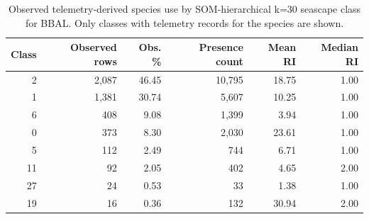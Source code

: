 \begin{table}[htbp]
\centering
\scriptsize
\caption{Observed telemetry-derived species use by SOM-hierarchical k=30 seascape class for BBAL. Only classes with telemetry records for the species are shown.}
\label{tab:appendix-observed-seascape-use-bbal}
\begin{tabular}{rrrrrr}
\hline
Class & Observed rows & Obs. \% & Presence count & Mean RI & Median RI \\
\hline
2 & 2,087 & 46.45 & 10,795 & 18.75 & 1.00 \\
1 & 1,381 & 30.74 & 5,607 & 10.25 & 1.00 \\
6 & 408 & 9.08 & 1,399 & 3.94 & 1.00 \\
0 & 373 & 8.30 & 2,030 & 23.61 & 1.00 \\
5 & 112 & 2.49 & 744 & 6.71 & 1.00 \\
11 & 92 & 2.05 & 402 & 4.65 & 2.00 \\
27 & 24 & 0.53 & 33 & 1.38 & 1.00 \\
19 & 16 & 0.36 & 132 & 30.94 & 2.00 \\
\hline
\end{tabular}
\end{table}

